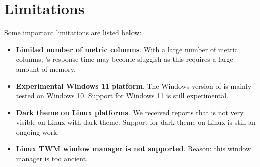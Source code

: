 
\section{Limitations}

Some important \hpcviewer{} limitations are listed below:
\begin{itemize}

\item \textbf{Limited number of metric columns}.
With a large number of metric columns, \hpcviewer{}'s response time may become sluggish as this requires a large amount of memory.

\item \textbf{Experimental Windows 11 platform}.
The Windows version of \hpcviewer{} is mainly tested on Windows 10. Support for Windows 11 is still experimental.

\item \textbf{Dark theme on Linux platforms}.
We received reports that \hpcviewer{} is not very visible on Linux with dark theme. Support for dark theme on Linux is still an ongoing work.

\item \textbf{Linux TWM window manager is not supported}.
Reason: this window manager is too ancient.


\end{itemize}

